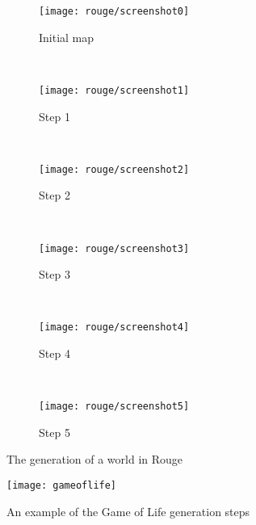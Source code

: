 
\begin{figure}[p]
	\centering
	\begin{subfigure}[b]{0.3\textwidth}
		\texttt{[image: rouge/screenshot0]}
		\caption{Initial map}
	\end{subfigure}	
	~
	\begin{subfigure}[b]{0.3\textwidth}
		\texttt{[image: rouge/screenshot1]}
		\caption{Step 1}
	\end{subfigure}	
	~
	\begin{subfigure}[b]{0.3\textwidth}
		\texttt{[image: rouge/screenshot2]}
		\caption{Step 2}
	\end{subfigure}	
	~
	\begin{subfigure}[b]{0.3\textwidth}
		\texttt{[image: rouge/screenshot3]}
		\caption{Step 3}
	\end{subfigure}		
	~
	\begin{subfigure}[b]{0.3\textwidth}
		\texttt{[image: rouge/screenshot4]}
		\caption{Step 4}
	\end{subfigure}
	~
	\begin{subfigure}[b]{0.3\textwidth}
		\texttt{[image: rouge/screenshot5]}
		\caption{Step 5}
	\end{subfigure}	
	\caption{The generation of a world in Rouge}\label{fig:rouge:screens}
\end{figure}

\begin{figure}[p]
\texttt{[image: gameoflife]}
\caption{An example of the Game of Life generation steps}\label{fig:game_of_life}
\end{figure}



